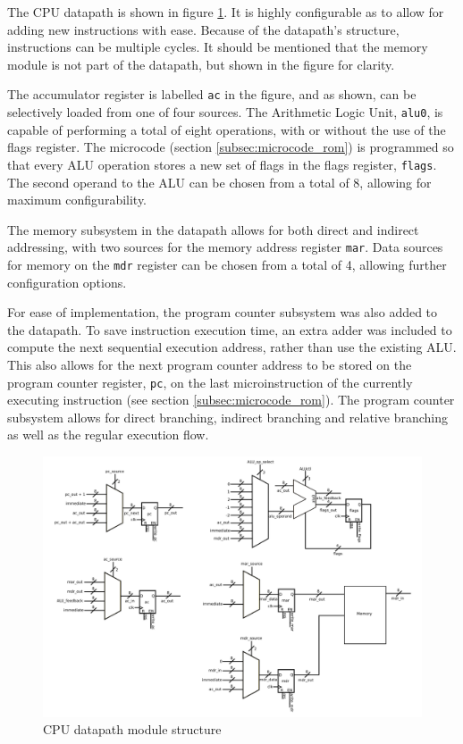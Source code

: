 The CPU datapath is shown in figure \ref{fig:datapath}. It is highly
configurable as to allow for adding new instructions with ease. Because of the
datapath's structure, instructions can be multiple cycles. It should be
mentioned that the memory module is not part of the datapath, but shown in the
figure for clarity.\par
The accumulator register is labelled \texttt{ac} in the figure, and as shown,
can be selectively loaded from one of four sources. The Arithmetic Logic Unit,
\texttt{alu0}, is capable of performing a total of eight operations, with or
without the use of the flags register. The microcode (section
\ref{subsec:microcode_rom}) is programmed so that every ALU operation stores a
new set of flags in the flags register, \texttt{flags}. The second operand to
the ALU can be chosen from a total of 8, allowing for maximum
configurability.\par
The memory subsystem in the datapath allows for both direct and indirect
addressing, with two sources for the memory address register \texttt{mar}. Data
sources for memory on the \texttt{mdr} register can be chosen from a total of
4, allowing further configuration options.\par
For ease of implementation, the program counter subsystem was also added to the
datapath. To save instruction execution time, an extra adder was included to
compute the next sequential execution address, rather than use the existing
ALU. This also allows for the next program counter address to be stored on the
program counter register, \texttt{pc}, on the last microinstruction of the
currently executing instruction (see section \ref{subsec:microcode_rom}). The
program counter subsystem allows for direct branching, indirect branching and
relative branching as well as the regular execution flow.
\begin{figure}[h]
	\centering
	\includegraphics[width=\textwidth]{../fig/datapath.pdf}
	\caption{CPU datapath module structure}
	\label{fig:datapath}
\end{figure}
